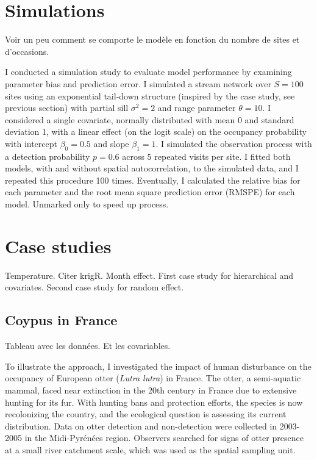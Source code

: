 \documentclass[
  11pt,
  a4paper,
]{article}
\begin{document}
\section{Simulations}\label{simulations}

Voir un peu comment se comporte le modèle en fonction du nombre de sites et d'occasions.

I conducted a simulation study to evaluate model performance by examining parameter bias and prediction error. I simulated a stream network over \(S = 100\) sites using an exponential tail-down structure (inspired by the case study, see previous section) with partial sill \(\sigma^2 = 2\) and range parameter \(\theta = 10\). I considered a single covariate, normally distributed with mean 0 and standard deviation 1, with a linear effect (on the logit scale) on the occupancy probability with intercept \(\beta_0 = 0.5\) and slope \(\beta_1 = 1\). I simulated the observation process with a detection probability \(p = 0.6\) across 5 repeated visits per site. I fitted both models, with and without spatial autocorrelation, to the simulated data, and I repeated this procedure 100 times. Eventually, I calculated the relative bias for each parameter and the root mean square prediction error (RMSPE) for each model. Unmarked only to speed up process.

\section{Case studies}\label{case-studies}

Temperature. Citer krigR. Month effect. First case study for hierarchical and covariates. Second case study for random effect.

\subsection{Coypus in France}\label{coypus-in-france}

Tableau avec les données. Et les covariables.

To illustrate the approach, I investigated the impact of human disturbance on the occupancy of European otter (\emph{Lutra lutra}) in France. The otter, a semi-aquatic mammal, faced near extinction in the 20th century in France due to extensive hunting for its fur. With hunting bans and protection efforts, the species is now recolonizing the country, and the ecological question is assessing its current distribution. Data on otter detection and non-detection were collected in 2003-2005 in the Midi-Pyrénées region. Observers searched for signs of otter presence at a small river catchment scale, which was used as the spatial sampling unit.
\end{document}
